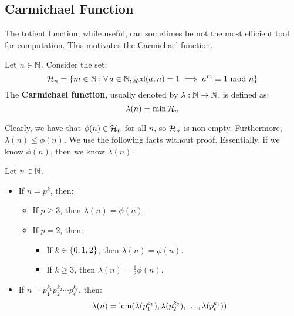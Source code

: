 \documentclass{article}
\begin{document}

\subsection{Carmichael Function}

The totient function, while useful, can sometimes be not the most efficient tool for computation.
This motivates the Carmichael function.

\begin{defn}
    Let $ n \in \mathbb{N} $. Consider the set:
    \begin{equation*}
        \mathcal{H}_{n} = \left\{{m \in \mathbb{N} : \forall \, a \in \mathbb{N}, \gcd(a, n) = 1
        \implies a^{m} \equiv 1 \ \mathrm{mod}\ n}\right\}
    \end{equation*}
    The \textbf{Carmichael function}, usually denoted by $ \lambda: \mathbb{N} \rightarrow \mathbb{N} $,
    is defined as:
    \begin{equation*}
        \lambda(n) = \min \mathcal{H}_{n}
    \end{equation*}
\end{defn}

Clearly, we have that $ \phi(n) \in \mathcal{H}_{n} $ for all $ n $, so $ \mathcal{H}_{n} $ is non-empty.
Furthermore, $ \lambda(n) \leq \phi(n) $. We use the following facts without proof.
Essentially, if we know $ \phi(n) $, then we know $ \lambda(n) $.

\begin{crll}
    Let $ n \in \mathbb{N} $.
    \begin{itemize}
        \item If $ n = p^{k} $, then:
            \begin{itemize}
                \item If $ p \geq 3 $, then $ \lambda(n) = \phi(n) $.
                \item If $ p = 2 $, then:
                    \begin{itemize}
                        \item If $ k \in \left\{{0, 1, 2}\right\} $, then $ \lambda(n) = \phi(n) $.
                        \item If $ k \geq 3 $, then $ \lambda(n) = \frac{1}{2}\phi(n) $.
                    \end{itemize}
            \end{itemize}
        \item If $ n = p_{1}^{k_{1}}p_{2}^{k_{2}}\cdots p_{\ell}^{k_{\ell}} $, then:
            \begin{equation*}
                \lambda(n) = \operatorname{lcm}(\lambda(p_{1}^{k_{1}}), \lambda(p_{2}^{k_{2}}),
                \dots, \lambda(p_{\ell}^{k_{\ell}}))
            \end{equation*}
    \end{itemize}
\end{crll}
\end{document}
